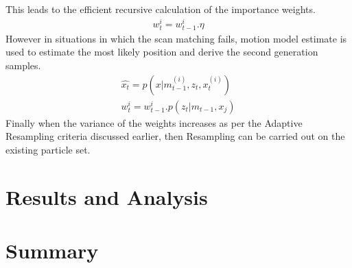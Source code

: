 This leads to the efficient recursive calculation of the importance weights.
\begin{gather} \label{gMap-w}
    w_{t}^{i} = w_{t-1}^{i}.\eta
\end{gather}
However in situations in which the scan matching fails, motion model estimate is used to estimate the most likely position and derive the second generation samples.
\begin{gather} \label{gMap-MM}
    \hat{x_t} = p(x|m_{t-1}^{(i)}, z_t, x_t^{(i)}) \\
    w_{t}^{i} = w_{t-1}^{i}.p(z_t | m_{t-1}, x_j)
\end{gather}
Finally when the variance of the weights increases as per the Adaptive Resampling criteria discussed earlier, then Resampling can be carried out on the existing particle
set.

\section{Results and Analysis}

\section{Summary}